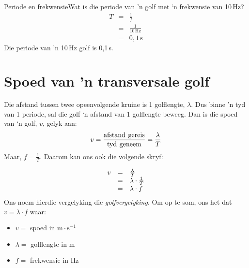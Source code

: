 \begin{definition}
\begin{wex}{Periode en frekwensie}{Wat is die periode van 'n golf met ‘n frekwensie van 10\,Hz?}
{\begin{eqnarray*}
T&=&\frac{1}{f}\\
&=&\frac{1}{10\,\text{Hz}}\\
&=&0,1\,\text{s}
\end{eqnarray*}
Die periode van 'n 10\,Hz golf is 0,1\,s.}
\end{wex}

    \noindent
      \label{m38806*uid21}
            \section{Spoed van 'n transversale golf}
            \nopagebreak
   
        \label{m38806*id319706}Die afstand tussen twee opeenvolgende kruine is 1 golflengte, $\lambda $. Dus binne 'n tyd van 1
    periode, sal die golf ‘n afstand van 1 golflengte beweeg. Dan is die spoed van ‘n golf, $v$, gelyk aan:
        \label{m38806*id319732}\nopagebreak\noindent{}
    \begin{equation}\nonumber
    v=\frac{\text{afstand}\phantom{\rule{4.pt}{0ex}}\text{gereis}}{\text{tyd}\phantom{\rule{4.pt}{0ex}}\text{geneem}}=\frac{\lambda }{T}
      \end{equation}
        \label{m38806*id319776}Maar, $f=\frac{1}{T}$. Daarom kan ons ook die volgende skryf: 
        \label{m38806*id319802}\nopagebreak\noindent{}
          
    \begin{equation}\nonumber
    \begin{array}{ccc}\hfill v& =& \frac{\lambda }{T}\hfill \\ & =& \lambda \ensuremath{\cdot}\frac{1}{T}\hfill \\ & =& \lambda \ensuremath{\cdot}f\hfill \end{array}
      \end{equation}
        \label{m38806*id319870}Ons noem hierdie vergelyking die \textsl{golfvergelyking}. Om op te som, ons het dat $v=\lambda \ensuremath{\cdot}f$ waar: 
        \label{m38806*id319901}\begin{itemize}[noitemsep]
            \label{m38806*uid22}\item $v=$ spoed in $\text{m}\ensuremath{\cdot}\text{s}{}^{-1}$\label{m38806*uid23}\item $\lambda =$ golflengte in $\text{m}$
\label{m38806*uid24}\item $f=$ frekwensie in $\text{Hz}$
\end{itemize}


\end{definition}
